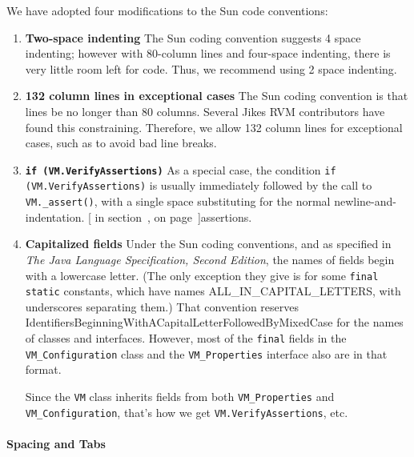 We have adopted four modifications to the Sun code conventions:
\begin{enumerate}
\item {\bf Two-space indenting} The Sun coding convention suggests 4
space indenting; however with 80-column lines and four-space indenting,
there is very little room left for code.  Thus, we recommend using 2
space indenting.

\item {\bf 132 column lines in exceptional cases} The Sun coding convention is
that lines be no longer than 80 columns.  Several Jikes RVM
contributors have found this constraining.  Therefore, we allow 132
column lines for exceptional cases, such as to avoid bad line breaks.

\item {\bf \tt if (VM.VerifyAssertions)}
As a special case, the condition {\tt if (VM.VerifyAssertions)} is
usually immediately followed by the call to {\tt VM.\_assert()},
with a single space substituting for the normal
newline-and-indentation.  [ in section~\Ref, on page~\Pageref]{assertions}.    

\item {\bf Capitalized fields} 
Under the Sun coding conventions, and as specified in 
{\em The Java Language Specification, Second Edition}, the names of
fields begin with a lowercase letter.  (The only exception they give
is for some {\tt final static} constants, which have names
ALL\-\_\-IN\-\_\-CA\-PI\-TAL\-\_\-LET\-TERS, with underscores separating them.)  That
convention reserves
IdentifiersBeginningWithACapitalLetterFollowedByMixedCase for the
names of classes and interfaces.  However, most of the {\tt final}
fields in the {\tt VM\_Configuration} class and the {\tt VM\_\-Pro\-per\-ties}
interface also are in that format.   

Since the {\tt VM} class inherits
fields from both {\tt VM\_Properties} and {\tt VM\_Configuration},
that's how we get {\tt VM.VerifyAssertions}, etc.
%

\end{enumerate}

\paragraph{Spacing and Tabs}

